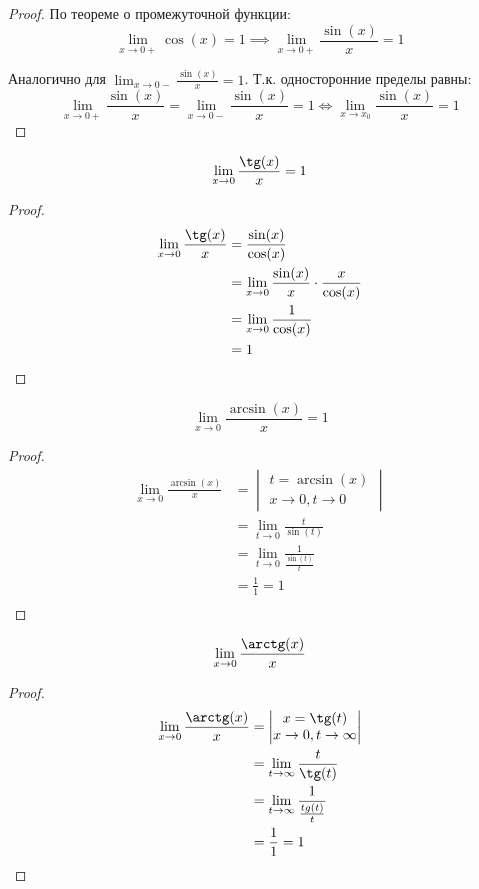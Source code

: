 \begin{proof}
   По теореме о промежуточной функции: \[
    \lim_{x \to 0+} \cos(x) = 1 \implies \lim_{x \to 0+} \frac{\sin(x)}{x} = 1 
   \] 

   Аналогично для $\lim_{x \to 0-} \frac{\sin(x)}{x} = 1$. Т.к. односторонние пределы равны: \[
   \lim_{x \to 0+} \frac{\sin(x)}{x} = \lim_{x \to 0-} \frac{\sin(x)}{x} = 1 \iff \lim_{x \to x_0} \frac{\sin(x)}{x} = 1
   \] 
\end{proof}

\begin{corollary}
  \[
  \lim_{x \to 0} \frac{\tg(x)}{x} = 1 
  \]
\end{corollary}
\begin{proof}
  \begin{align*}
    \lim_{x \to 0} \frac{\tg(x)}{x} &= \frac{\sin(x)}{\cos(x)} \\
    &= \lim_{x \to 0} \frac{\sin(x)}{x} \cdot \frac{x}{\cos(x)} \\
    &= \lim_{x \to 0} \frac{1}{\cos(x)} \\
    &= 1 \\
  \end{align*}
\end{proof}

\begin{corollary}
  \[
  \lim_{x \to 0} \frac{\arcsin(x)}{x} = 1
  \] 
\end{corollary}
\begin{proof}
  \begin{align*}
    \lim_{x \to 0} \frac{\arcsin(x)}{x} &= 
    \begin{vmatrix}
      t = \arcsin(x) \\
      x \to 0, t \to 0
    \end{vmatrix} \\
    &= \lim_{t \to 0} \frac{t}{\sin(t)} \\
    &= \lim_{t \to 0} \frac{1}{\frac{\sin(t)}{t}} \\
    &= \frac{1}{1} = 1 \\
  \end{align*}
\end{proof}

\begin{corollary}
  \[
  \lim_{x \to 0} \frac{\arctg(x)}{x}
  \] 
\end{corollary}
\begin{proof}
  \begin{align*}
    \lim_{x \to 0} \frac{\arctg(x)}{x} &= 
    \begin{vmatrix}
      x = \tg(t) \\
      x \to 0, t \to\infty
    \end{vmatrix}
    \\
    &= \lim_{t \to \infty} \frac{t}{\tg(t)} \\
    &= \lim_{t \to \infty} \frac{1}{\frac{tg(t)}{t}} \\
    &= \frac{1}{1} = 1 \\
  \end{align*}
\end{proof}


